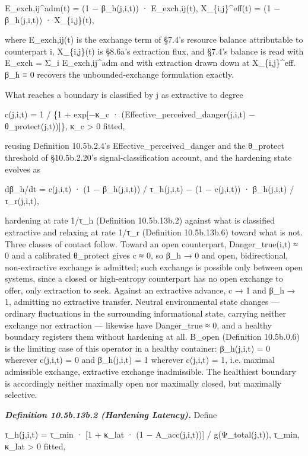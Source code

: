 \documentclass[
]{article}
\begin{document}
E\_exch,ij\^{}adm(t) = (1 − β\_h(j,i,t)) · E\_exch,ij(t),
X\_\{i,j\}\^{}eff(t) = (1 − β\_h(j,i,t)) · X\_\{i,j\}(t),

where E\_exch,ij(t) is the exchange term of §7.4's resource balance
attributable to counterpart i, X\_\{i,j\}(t) is §8.6a's extraction flux,
and §7.4's balance is read with E\_exch = Σ\_i E\_exch,ij\^{}adm and
with extraction drawn down at X\_\{i,j\}\^{}eff. β\_h ≡ 0 recovers the
unbounded-exchange formulation exactly.

What reaches a boundary is classified by j as extractive to degree

c(j,i,t) = 1 / \{1 + exp{[}−κ\_c · (Effective\_perceived\_danger(j,i,t)
− θ\_protect(j,t)){]}\}, κ\_c \textgreater{} 0 fitted,

reusing Definition 10.5b.2.4's Effective\_perceived\_danger and the
θ\_protect threshold of §10.5b.2.20's signal-classification account, and
the hardening state evolves as

dβ\_h/dt = c(j,i,t) · (1 − β\_h(j,i,t)) / τ\_h(j,i,t) − (1 − c(j,i,t)) ·
β\_h(j,i,t) / τ\_r(j,i,t),

hardening at rate 1/τ\_h (Definition 10.5b.13b.2) against what is
classified extractive and relaxing at rate 1/τ\_r (Definition
10.5b.13b.6) toward what is not. Three classes of contact follow. Toward
an open counterpart, Danger\_true(i,t) ≈ 0 and a calibrated θ\_protect
gives c ≈ 0, so β\_h → 0 and open, bidirectional, non-extractive
exchange is admitted; such exchange is possible only between open
systems, since a closed or high-entropy counterpart has no open exchange
to offer, only extraction to seek. Against an extractive advance, c → 1
and β\_h → 1, admitting no extractive transfer. Neutral environmental
state changes --- ordinary fluctuations in the surrounding informational
state, carrying neither exchange nor extraction --- likewise have
Danger\_true ≈ 0, and a healthy boundary registers them without
hardening at all. B\_open (Definition 10.5b.0.6) is the limiting case of
this operator in a healthy container: β\_h(j,i,t) = 0 wherever c(j,i,t)
= 0 and β\_h(j,i,t) = 1 wherever c(j,i,t) = 1, i.e. maximal admissible
exchange, extractive exchange inadmissible. The healthiest boundary is
accordingly neither maximally open nor maximally closed, but maximally
selective.

\emph{\textbf{Definition 10.5b.13b.2 (Hardening Latency).}} Define

τ\_h(j,i,t) = τ\_min · {[}1 + κ\_lat · (1 − A\_acc(j,i,t)){]} /
g(Ψ\_total(j,t)), τ\_min, κ\_lat \textgreater{} 0 fitted,
\end{document}

